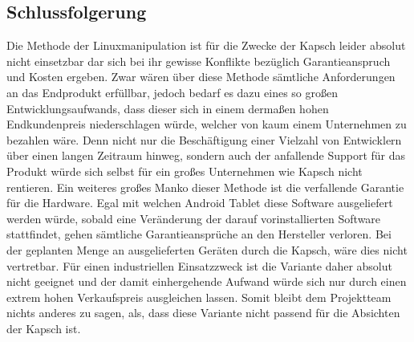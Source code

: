 \subsection{Schlussfolgerung}
Die Methode der Linuxmanipulation ist für die Zwecke der Kapsch leider absolut nicht einsetzbar dar sich bei ihr gewisse Konflikte bezüglich Garantieanspruch und Kosten ergeben. Zwar wären über diese Methode sämtliche Anforderungen an das Endprodukt erfüllbar, jedoch bedarf es dazu eines so großen Entwicklungsaufwands, dass dieser sich in einem dermaßen hohen Endkundenpreis niederschlagen würde, welcher von kaum einem Unternehmen zu bezahlen wäre. Denn nicht nur die Beschäftigung einer Vielzahl von Entwicklern über einen langen Zeitraum hinweg, sondern auch der anfallende Support für das Produkt würde sich selbst für ein großes Unternehmen wie Kapsch nicht rentieren. Ein weiteres großes Manko dieser Methode ist die verfallende Garantie für die Hardware. Egal mit welchen Android Tablet diese Software ausgeliefert werden würde, sobald eine Veränderung der darauf vorinstallierten Software stattfindet, gehen sämtliche Garantieansprüche an den Hersteller verloren. Bei der geplanten Menge an ausgelieferten Geräten durch die Kapsch, wäre dies nicht vertretbar. Für einen industriellen Einsatzzweck ist die Variante daher absolut nicht geeignet und der damit einhergehende Aufwand würde sich nur durch einen extrem hohen Verkaufspreis ausgleichen lassen. Somit bleibt dem Projektteam nichts anderes zu sagen, als, dass diese Variante nicht passend für die Absichten der Kapsch ist.